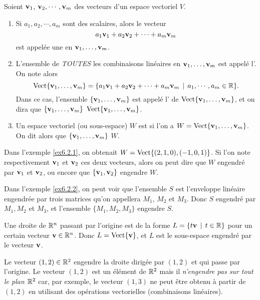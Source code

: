 Soient $\mathbf{v}_1$, $\mathbf{v}_2, \cdots, \mathbf{v}_m$ des vecteurs d'un espace vectoriel $V$.
\begin{definition}
 \begin{enumerate}
\item Si $a_1, a_2, \cdots, a_m$ sont des scalaires, alors le
vecteur
$$
a_1\mathbf{v}_1 + a_2\mathbf{v}_2 + \cdots + a_m \mathbf{v}_m
$$
est appelée une  en $\mathbf{v}_1, \ldots, \mathbf{v}_m$.
\item L'ensemble de \emph{TOUTES} les combinaisons linéaires en $\mathbf{v}_1, \ldots, \mathbf{v}_m$
est appelé l'.  On note alors
$$
\textrm{Vect}\{\mathbf{v}_1, \ldots, \mathbf{v}_m\} = \{ a_1\mathbf{v}_1 + a_2\mathbf{v}_2 + \cdots + a_m \mathbf{v}_m \, \mid \, a_1, \cdots, a_m \in \mathbb{R}\}.
$$
Dans ce cas, l'ensemble $\{\mathbf{v}_1, \ldots, \mathbf{v}_m\}$ est appelé l'
de $\textrm{Vect}\{\mathbf{v}_1, \ldots, \mathbf{v}_m\}$, et on dira que $\{\mathbf{v}_1, \ldots, \mathbf{v}_m\}$
 $\textrm{Vect}\{\mathbf{v}_1, \ldots, \mathbf{v}_m\}$.
\item Un espace vectoriel (ou sous-espace) $W$ est  si l'on a $W = \textrm{Vect}\{\mathbf{v}_1, \ldots, \mathbf{v}_m\}$.  On dit alors que $\{\mathbf{v}_1, \ldots, \mathbf{v}_m\}$  $W$.
\end{enumerate}
\end{definition}

\begin{myexample} Dans l'exemple \ref{ex6.2.1}, on obtenait $W = \textrm{Vect}\{ (2,1,0), (-1,0,1)\}$. Si l'on note respectivement $\mathbf{v}_1$ et $\mathbf{v}_2$ ces deux vecteurs, alors on peut dire que $W$ engendré par $\mathbf{v}_1$ et $\mathbf{v}_2$, ou encore que $\{ \mathbf{v}_1,\mathbf{v}_2\}$ engendre $W$. \end{myexample}

\begin{myexample} Dans l'exemple \ref{ex6.2.2}, on peut voir que l'ensemble $S$  est l'enveloppe linéaire engendrée par trois matrices qu'on appellera
$M_1$, $M_2$ et $M_3$.  Donc $S$ engendré par $M_1, M_2$ et $M_3$, et l'ensemble $\{M_1, M_2, M_3\}$ engendre $S$.
\end{myexample}

\begin{myexample} Une droite de $\mathbb{R}^n$ passant par l'origine est de la forme $L = \{ t\mathbf{v} \, \mid \, t\in \mathbb{R}\}$ pour un certain vecteur $\mathbf{v}\in\mathbb{R}^n$.
Donc $L = \textrm{Vect}\{ \mathbf{v}\}$, et $L$ est le sous-espace engendré par le vecteur
$\mathbf{v}$.
\end{myexample}

\begin{myexample} Le vecteur $(1,2)\in \mathbb{R}^2$ engendre la droite dirigée par $(1,2)$ et qui passe par l'origine.
Le vecteur $(1,2)$ est un élément de $\mathbb{R}^2$ mais il \emph{n'engendre pas sur tout le plan $\mathbb{R}^2$} car, par exemple, le vecteur $(1,3)$ ne peut être obtenu à partir de $(1,2)$ en utilisant des opérations vectorielles (combinaisons linéaires).
\end{myexample}

